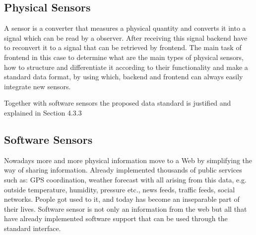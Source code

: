 	\subsection {Physical Sensors}
	A sensor is a converter that measures a physical quantity and converts it into a signal which can be read by a observer. After receiving this signal backend have to reconvert it to a signal that can be retrieved by frontend. The main task of frontend in this case to determine what are the main types of physical sensors, how to structure and differentiate it according to their functionality and make a standard data format, by using which, backend and frontend can always easily integrate new sensors.
    
    Together with software sensors the proposed data standard is justified and explained in Section 4.3.3

	\subsection {Software Sensors}
	Nowadays more and more physical information move to a Web by simplifying the way of sharing information. Already implemented thousands of public services such as: GPS coordination, weather forecast with all arising from this data, e.g. outside temperature, humidity, pressure etc., news feeds, traffic feeds, social networks. People got used to it, and today has become an inseparable part of their lives. Software sensor is not only an information from the web but all that have already implemented software support that can be used through the standard interface.
	
